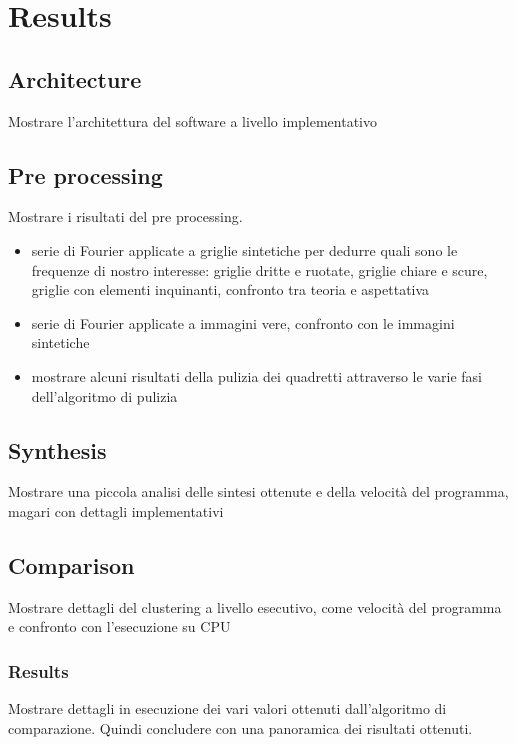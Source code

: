 \chapter{Results}
\begin{toDo}
	\section{Architecture}
	Mostrare l'architettura del software a livello implementativo
    \section{Pre processing}
    Mostrare i risultati del pre processing.
    \begin{itemize}
        \item serie di Fourier applicate a griglie sintetiche per dedurre quali sono le frequenze di nostro interesse: griglie dritte e ruotate, griglie chiare e scure, griglie con elementi inquinanti, confronto tra teoria e aspettativa
        \item serie di Fourier applicate a immagini vere, confronto con le immagini sintetiche
        \item mostrare alcuni risultati della pulizia dei quadretti attraverso le varie fasi dell'algoritmo di pulizia
    \end{itemize}
    \section{Synthesis}
    Mostrare una piccola analisi delle sintesi ottenute e della velocità del programma, magari con dettagli implementativi
    \section{Comparison}
   		Mostrare dettagli del clustering a livello esecutivo, come velocità del programma e confronto con l'esecuzione su CPU
    	\subsection{Results}
    		Mostrare dettagli in esecuzione dei vari valori ottenuti dall'algoritmo di comparazione. Quindi concludere con una panoramica dei risultati ottenuti.
\end{toDo}



